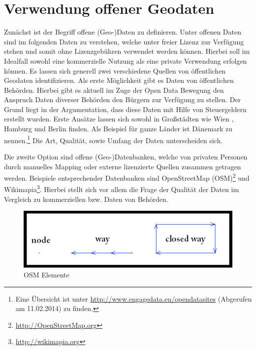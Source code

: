 \section{Verwendung offener Geodaten}
\label{ch3:s:offeneGeodaten}

Zunächst ist der Begriff offene (Geo-)Daten zu definieren.
Unter offenen Daten sind im folgenden Daten zu verstehen, welche unter freier Lizenz zur Verfügung stehen und somit ohne Lizenzgebühren verwendet werden können. Hierbei soll im Idealfall sowohl eine kommerzielle Nutzung als eine private Verwendung erfolgen können.
Es lassen sich generell zwei verschiedene Quellen von öffentlichen Geodaten identifizieren.
Als erste Möglichkeit gibt es Daten von öffentlichen Behörden. Hierbei gibt es aktuell im Zuge der Open Data Bewegung \cite{Oreilly.2007} den Anspruch Daten diverser Behörden den Bürgern zur Verfügung zu stellen. Der Grund liegt in der Argumentation, dass diese Daten mit Hilfe von Steuergeldern erstellt wurden. Erste Ansätze lassen sich sowohl in Großstädten wie Wien \cite{Wien.2014}, Hamburg \cite{Hamburg.2014} und Berlin \cite{Berlin.2014} finden. Als Beispiel für ganze Länder ist Dänemark \cite{Denmark.2014} zu nennen.\footnote{Eine Übersicht ist unter \url{http://www.engagedata.eu/opendatasites} (Abgerufen am 11.02.2014) zu finden. } Die Art, Qualität, sowie Umfang der Daten unterscheiden sich.
 
Die zweite Option sind offene (Geo-)Datenbanken, welche von privaten Personen durch manuelles Mapping oder externe lizenzierte Quellen zusammen getragen werden.
Beispiele entsprechender Datenbanken sind OpenStreetMap (OSM)\footnote{\url{http://OpenStreetMap.org}} und Wikimapia\footnote{\url{http://wikimapia.org}}.
Hierbei stellt sich vor allem die Frage der Qualität der Daten im Vergleich zu kommerziellen bzw. Daten von Behörden.

\begin{figure}[H]
\begin{center}
\includegraphics[width=120mm]{images/ch3_img03_OSM1.png}
\caption{OSM Elemente}
\label{img:ch03_img03_OSM1}
\end{center}
\end{figure}

